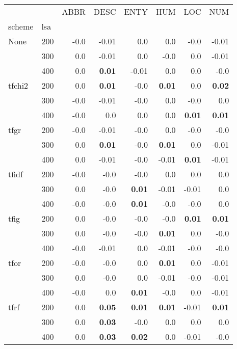 \begin{table}[H]
\begin{center}

\begin{tabular}{ll|rrrrrr}
\toprule
   &   & ABBR & DESC & ENTY & HUM & LOC & NUM \\
scheme & lsa &         &         &         &         &         &         \\
\midrule
None & 200 &       -0.0 &      -0.01 &       0.0 &       0.0 &      -0.0 &      -0.01 \\
   & 300 &       0.0 &      -0.01 &       0.0 &      -0.0 &       0.0 &      -0.01 \\
   & 400 &       0.0 &  \textbf{0.01} &      -0.01 &       0.0 &       0.0 &      -0.0 \\
tfchi2 & 200 &       0.0 &  \textbf{0.01} &       -0.0 &  \textbf{0.01} &       0.0 &  \textbf{0.02} \\
   & 300 &       -0.0 &      -0.01 &       -0.0 &       0.0 &      -0.0 &       0.0 \\
   & 400 &       -0.0 &       0.0 &       0.0 &       0.0 &  \textbf{0.01} &  \textbf{0.01} \\
tfgr & 200 &       -0.0 &      -0.01 &       -0.0 &       0.0 &      -0.0 &      -0.0 \\
   & 300 &       0.0 &  \textbf{0.01} &       -0.0 &  \textbf{0.01} &       0.0 &      -0.01 \\
   & 400 &       0.0 &      -0.01 &       -0.0 &      -0.01 &  \textbf{0.01} &      -0.01 \\
tfidf & 200 &       -0.0 &       -0.0 &       -0.0 &       0.0 &       0.0 &       0.0 \\
   & 300 &       0.0 &       -0.0 &  \textbf{0.01} &      -0.01 &      -0.01 &       0.0 \\
   & 400 &       -0.0 &       -0.0 &  \textbf{0.01} &      -0.0 &      -0.0 &       0.0 \\
tfig & 200 &       0.0 &       -0.0 &       -0.0 &      -0.0 &  \textbf{0.01} &  \textbf{0.01} \\
   & 300 &       0.0 &       -0.0 &       -0.0 &  \textbf{0.01} &       0.0 &      -0.0 \\
   & 400 &       -0.0 &      -0.01 &       0.0 &      -0.01 &      -0.0 &      -0.0 \\
tfor & 200 &       -0.0 &       -0.0 &       0.0 &  \textbf{0.01} &       0.0 &      -0.01 \\
   & 300 &       0.0 &       -0.0 &       0.0 &      -0.01 &      -0.0 &      -0.01 \\
   & 400 &       -0.0 &       0.0 &  \textbf{0.01} &      -0.0 &       0.0 &      -0.01 \\
tfrf & 200 &       0.0 &  \textbf{0.05} &  \textbf{0.01} &  \textbf{0.01} &      -0.01 &  \textbf{0.01} \\
   & 300 &       0.0 &  \textbf{0.03} &       -0.0 &       0.0 &       0.0 &       0.0 \\
   & 400 &       0.0 &  \textbf{0.03} &  \textbf{0.02} &       0.0 &      -0.01 &      -0.0 \\
\bottomrule
\end{tabular}


\end{center}
\end{table}

